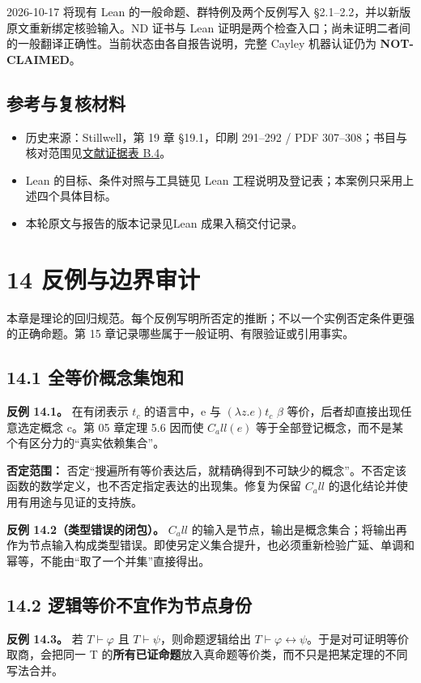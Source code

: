 \documentclass[UTF8,a4paper,zihao=-4,fontset=windows,openany]{ctexbook}
\newcommand{\mcsorigin}[1]{\par\noindent{\small\color{black!55}#1}\par\addvspace{0.8em}}
\def\mathrm#1{#1}%
\begin{document}
2026-10-17 将现有 Lean 的一般命题、群特例及两个反例写入 §2.1–2.2，并以新版原文重新绑定核验输入。ND 证书与 Lean 证明是两个检查入口；尚未证明二者间的一般翻译正确性。当前状态由各自报告说明，完整 Cayley 机器认证仍为 \textbf{NOT-CLAIMED}。

\section{参考与复核材料}
\begin{itemize}
\item 历史来源：Stillwell，第 19 章 §19.1，印刷 291–292 / PDF 307–308；书目与核对范围见\hyperref[mcs-source-25]{文献证据表 B.4}。
\item Lean 的目标、条件对照与工具链见 Lean 工程说明及登记表；本案例只采用上述四个具体目标。
\item 本轮原文与报告的版本记录见Lean 成果入稿交付记录。
\end{itemize}
\clearpage\chapter{14 反例与边界审计}
\label{mcs-source-20}
\mcsorigin{原章节：14-反例集.md}
本章是理论的回归规范。每个反例写明所否定的推断；不以一个实例否定条件更强的正确命题。第 15 章记录哪些属于一般证明、有限验证或引用事实。

\section{14.1 全等价概念集饱和}
\textbf{反例 14.1。} 在有闭表示 \(t_c\) 的语言中，e 与 \((\lambda z.e)t_c\) \(\beta\) 等价，后者却直接出现任意选定概念 c。第 05 章定理 5.6 因而使 \(C_\mathrm{all}(e)\) 等于全部登记概念，而不是某个有区分力的“真实依赖集合”。

\textbf{否定范围：} 否定“搜遍所有等价表达后，就精确得到不可缺少的概念”。不否定该函数的数学定义，也不否定指定表达的出现集。修复为保留 \(C_\mathrm{all}\) 的退化结论并使用有用途与见证的支持族。

\textbf{反例 14.2（类型错误的闭包）。} \(C_\mathrm{all}\) 的输入是节点，输出是概念集合；将输出再作为节点输入构成类型错误。即使另定义集合提升，也必须重新检验广延、单调和幂等，不能由“取了一个并集”直接得出。

\section{14.2 逻辑等价不宜作为节点身份}
\textbf{反例 14.3。} 若 \(T\vdash\varphi\) 且 \(T\vdash\psi\)，则命题逻辑给出 \(T\vdash\varphi\leftrightarrow\psi\)。于是对可证明等价取商，会把同一 T 的\textbf{所有已证命题}放入真命题等价类，而不只是把某定理的不同写法合并。
\end{document}
